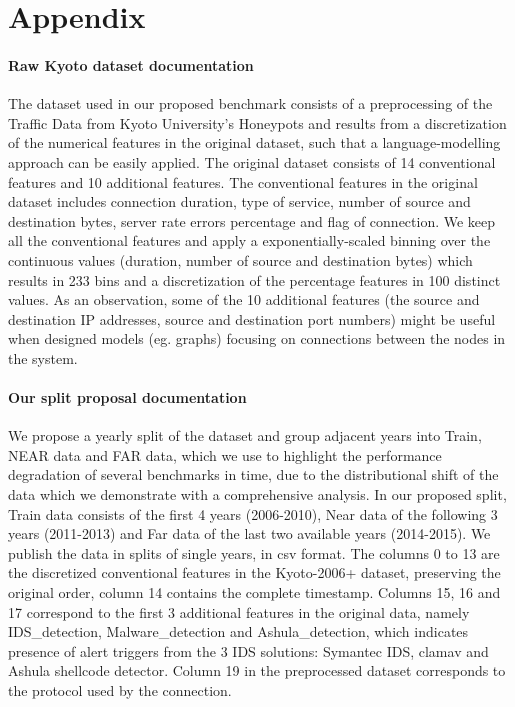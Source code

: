 \documentclass{article}
\begin{document}
\section{Appendix}
\label{sec:appendix_own}
\paragraph{Raw Kyoto dataset documentation}
The dataset used in our proposed benchmark consists of a preprocessing of the Traffic Data from Kyoto University's Honeypots and results from a discretization of the numerical features in the original dataset, such that a language-modelling approach can be easily applied. The original dataset consists of 14 conventional features and 10 additional features. The conventional features in the original dataset includes connection duration, type of service, number of source and destination bytes, server rate errors percentage and flag of connection. We keep all the conventional features and apply a exponentially-scaled binning over the continuous values (duration, number of source and destination bytes) which results in 233 bins and a discretization of the percentage features in 100 distinct values. As an observation, some of the 10 additional features (the source and destination IP addresses, source and destination port numbers) might be useful when designed models (eg. graphs) focusing on connections between the nodes in the system. 


\paragraph{Our split proposal documentation}
We propose a yearly split of the dataset and group adjacent years into Train, NEAR data and FAR data, which we use to highlight the performance degradation of several benchmarks in time, due to the distributional shift of the data which we demonstrate with a comprehensive analysis. In our proposed split, Train data consists of the first 4 years (2006-2010), Near data of the following 3 years (2011-2013) and Far data of the last two available years (2014-2015). We publish the data in splits of single years, in csv format. The columns 0 to 13 are the discretized conventional features in the Kyoto-2006+ dataset, preserving the original order, column 14 contains the complete timestamp. Columns 15, 16 and 17 correspond to the first 3 additional features in the original data, namely IDS\_detection, Malware\_detection and Ashula\_detection, which indicates presence of alert triggers from the 3 IDS solutions: Symantec IDS, clamav and Ashula shellcode detector. Column 19 in the preprocessed dataset corresponds to the protocol used by the connection.
\end{document}
